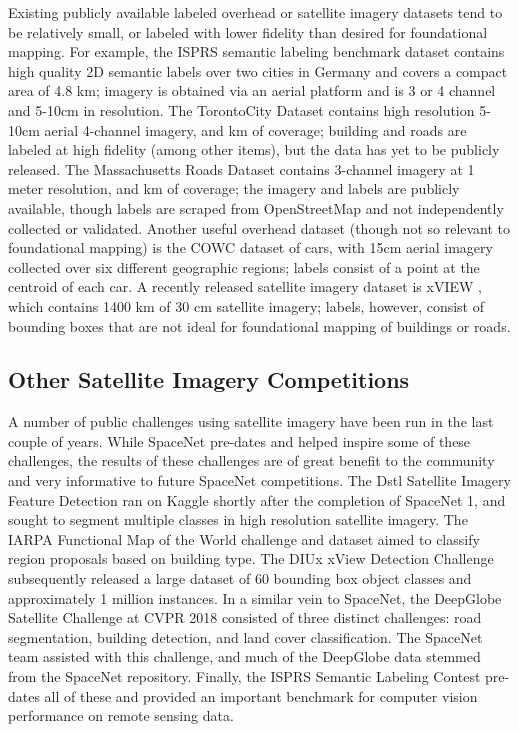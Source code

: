 \documentclass{article}
\begin{document}
Existing publicly available labeled overhead or satellite imagery datasets tend to be relatively small, or labeled with lower fidelity than desired for foundational mapping.  For example, the ISPRS semantic labeling benchmark \cite{isprs_sem}
dataset contains high quality 2D semantic labels over two cities in Germany and covers a compact area of 4.8 km; 
imagery is obtained via an aerial platform and is 3 or 4 channel and  5-10cm in resolution.  The TorontoCity Dataset \cite{torontocity} contains high resolution 5-10cm aerial 4-channel imagery, and  km of coverage; building and roads are labeled at high fidelity (among other items), but the data has yet to be publicly released.  The Massachusetts Roads Dataset \cite{MnihThesis} contains 3-channel imagery at 1 meter resolution, and  km of coverage; the imagery and labels are publicly available, though labels are scraped from OpenStreetMap and not independently collected or validated. Another useful overhead dataset (though not so relevant to foundational mapping) is the COWC dataset \cite{cowc} of cars, with 15cm aerial imagery collected over six different geographic regions; labels consist of a point at the centroid of each car. A recently released satellite imagery dataset is xVIEW \cite{xview_data}, which contains 1400 km of 30 cm satellite imagery; labels, however, consist of bounding boxes that are not ideal for foundational mapping of buildings or roads.  

\subsection{Other Satellite Imagery Competitions}
	A number of public challenges using satellite imagery have been run in the last couple of years.  While SpaceNet pre-dates and helped inspire some of these challenges, the results of these challenges are of great benefit to the community and very informative to future SpaceNet competitions.  
	The Dstl Satellite Imagery Feature Detection \cite{dstl} ran on Kaggle shortly after the completion of SpaceNet 1, and sought to segment multiple classes in high resolution satellite imagery.  
	The IARPA Functional Map of the World \cite{fmow} challenge and dataset aimed to classify region proposals based on building type. 
	The DIUx xView Detection Challenge \cite{xview} subsequently released a large dataset of 60 bounding box object classes and approximately 1 million instances.  
	In a similar vein to SpaceNet, the DeepGlobe Satellite Challenge at CVPR 2018 \cite{deepglobe} consisted of three distinct challenges: road segmentation, building detection, and land cover classification.  The SpaceNet team assisted with this challenge, and much of the DeepGlobe data stemmed from the SpaceNet repository.  Finally, the ISPRS Semantic Labeling Contest  \cite{isprssemlab} pre-dates all of these and provided an important benchmark for computer vision performance on remote sensing data.
	
\end{document}
